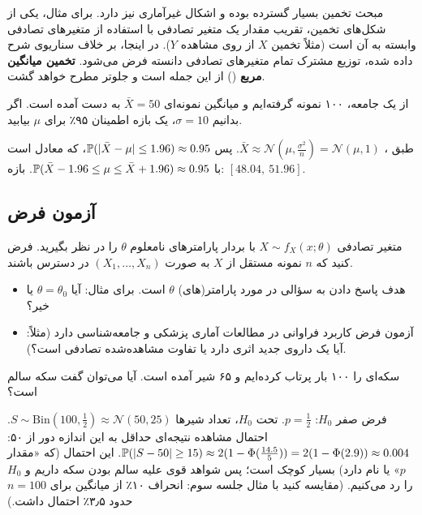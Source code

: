 \begin{note}
\notetitle مبحث تخمین بسیار گسترده بوده و اشکال غیرآماری نیز دارد. برای مثال، یکی از شکل‌های تخمین، تقریب مقدار یک متغیر تصادفی با استفاده از متغیرهای تصادفی وابسته به آن است (مثلاً تخمین $X$ از روی مشاهده $Y$). در اینجا، بر خلاف سناریوی شرح داده شده، توزیع مشترک تمام متغیرهای تصادفی دانسته فرض می‌شود. \textbf{تخمین میانگین مربع} () از این جمله است و جلوتر مطرح خواهد گشت.
\end{note}

\begin{example}
از یک جامعه، ۱۰۰ نمونه گرفته‌ایم و میانگین نمونه‌ای $\bar X=50$ به دست آمده است. اگر بدانیم $\sigma=10$، یک بازه اطمینان ۹۵٪ برای $\mu$ بیابید.
\begin{solution}
طبق ، $\bar X\approx\mathcal N(\mu,\frac{\sigma^2}{n})=\mathcal N(\mu,1)$. پس $\mathbb{P}(|\bar X-\mu|\le1.96)\approx0.95$، که معادل است با $\mathbb{P}(\bar X-1.96\le\mu\le\bar X+1.96)\approx0.95$. بازه: $[48.04,\ 51.96]$.
\end{solution}
\end{example}

\subsection{آزمون فرض }
متغیر تصادفی $X\sim f_X(x;\theta)$ با بردار پارامترهای نامعلوم $\theta$ را در نظر بگیرید. فرض کنید که $n$ نمونه مستقل از $X$ به صورت $(X_1,\ldots,X_n)$ در دسترس باشند.
\begin{itemize}
\item هدف پاسخ دادن به سؤالی در مورد پارامتر(های) $\theta$ است. برای مثال: آیا $\theta=\theta_0$ یا خیر؟
\item آزمون فرض کاربرد فراوانی در مطالعات آماری پزشکی و جامعه‌شناسی دارد (مثلاً: آیا یک داروی جدید اثری دارد یا تفاوت مشاهده‌شده تصادفی است؟).
\end{itemize}

\begin{example}
سکه‌ای را ۱۰۰ بار پرتاب کرده‌ایم و ۶۵ شیر آمده است. آیا می‌توان گفت سکه سالم است؟
\begin{solution}
فرض صفر $H_0$: $p=\frac12$. تحت $H_0$، تعداد شیرها $S\sim\mathrm{Bin}(100,\frac12)\approx\mathcal N(50,25)$. احتمال مشاهده نتیجه‌ای حداقل به این اندازه دور از ۵۰:
$\mathbb{P}(|S-50|\ge15)\approx2(1-\Phi(\frac{14.5}{5}))=2(1-\Phi(2.9))\approx0.004$. این احتمال (که «مقدار $p$» یا  نام دارد) بسیار کوچک است؛ پس شواهد قوی علیه سالم بودن سکه داریم و $H_0$ را رد می‌کنیم. (مقایسه کنید با مثال جلسه سوم: انحراف ۱۰٪ از میانگین برای $n=100$ حدود ۳٫۵٪ احتمال داشت.)
\end{solution}
\end{example}

